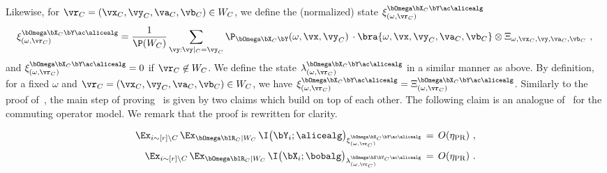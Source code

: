 Likewise, for $\vr_C = (\vx_C, \vy_C, \va_C, \vb_C) \in W_C$, we define the (normalized) state $\xi^{\bOmega \bX_C \bY \ac \alicealg}_{(\omega, \vr_C)}$
\begin{equation*}
	\xi^{\bOmega \bX_C \bY \ac \alicealg}_{(\omega, \vr_C)} = \frac{1}{\P(W_C)} \sum_{\vy: \vy|_{C} = \vy_C} \P_{\bOmega \bX_C \bY} (\omega,\vx, \vy_C) \,  \cdot \bra{\omega, \vx, \vy_C, \va_C, \vb_C} \otimes \Xi_{\omega,\vx_C, \vy,\va_C,\vb_C} ~,  \\
\end{equation*}
and $\xi^{\bOmega \bX_C \bY \ac \alicealg}_{(\omega, \vr_C)} = 0$  if $\vr_C \not\in W_C$. We define the state $\lambda^{\bOmega \bX_C \bY \ac \alicealg}_{(\omega, \vr_C)} $ in a similar manner as above. By definition, for a fixed $\omega$ and $\vr_C = (\vx_C, \vy_C, \va_C, \vb_C) \in W_C$, we have $\xi^{\bOmega \bX_C \bY \ac \alicealg}_{(\omega, \vr_C)} = \Xi^{\bOmega \bX_C \bY \ac \alicealg}_{(\omega, \vr_C)}$. Similarly to the proof of~\cite[Lemma 5.12]{bavarianAnchoredParallelRepetition2021}, the main step of proving~ is given by two claims which build on top of each other. The following claim is an analogue of~\cite[Claim 5.13]{bavarianAnchoredParallelRepetition2021} for the commuting operator model. We remark that the proof is rewritten for clarity.  

\begin{claim}\label{claim:xi-change-x}
	\begin{align}
		\label{eq:xi-change-1}\Ex_{i \sim [r] \setminus C} \,  \Ex_{\bOmega \blR_C| W_C}\, \I \big (\bY_i ; \alicealg \big )_{	\xi^{\bOmega \bX_C \bY \ac \alicealg}_{(\omega, \vr_C)}} \,&= \, O(\eta_{\text{PR}})~,  \\
		\label{eq:xi-change-2} \Ex_{i \sim [r] \setminus C} \,  \Ex_{\bOmega \blR_C| W_C} \,\I \big (\bX_i ; \bobalg \big )_{	\lambda^{\bOmega \bX \bY_C  \ac \alicealg}_{(\omega, \vr_C)} } \,&= \, O(\eta_{\text{PR}})~. 
	\end{align}
\end{claim}

